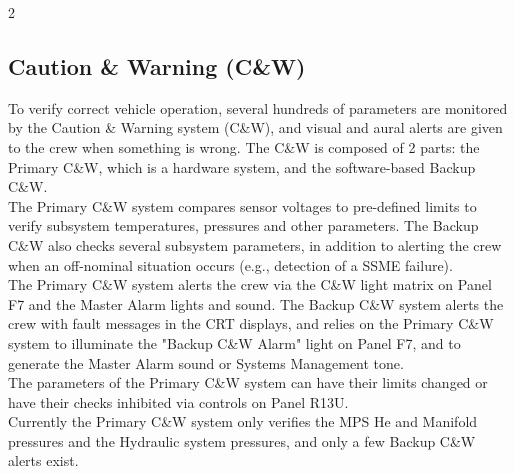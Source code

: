\documentclass[Space_Shuttle_Vessel_Manual.tex]{subfiles}
\begin{document}
\begin{multicols*}{2}
\subsection{Caution \& Warning (C\&W)}
To verify correct vehicle operation, several hundreds of parameters are monitored by the Caution \& Warning system (C\&W), and visual and aural alerts are given to the crew when something is wrong. The C\&W is composed of 2 parts: the Primary C\&W, which is a hardware system, and the software-based Backup C\&W.\\
The Primary C\&W system compares sensor voltages to pre-defined limits to verify subsystem temperatures, pressures and other parameters. The Backup C\&W also checks several subsystem parameters, in addition to alerting the crew when an off-nominal situation occurs (e.g., detection of a SSME failure).\\
The Primary C\&W system alerts the crew via the C\&W light matrix on Panel F7 and the Master Alarm lights and sound. The Backup C\&W system alerts the crew with fault messages in the CRT displays, and relies on the Primary C\&W system to illuminate the "Backup C\&W Alarm" light on Panel F7, and to generate the Master Alarm sound or Systems Management tone.\\
The parameters of the Primary C\&W system can have their limits changed or have their checks inhibited via controls on Panel R13U.\\
Currently the Primary C\&W system only verifies the MPS He and Manifold pressures and the Hydraulic system pressures, and only a few Backup C\&W alerts exist.
\newpage



\end{multicols*}
\end{document}
